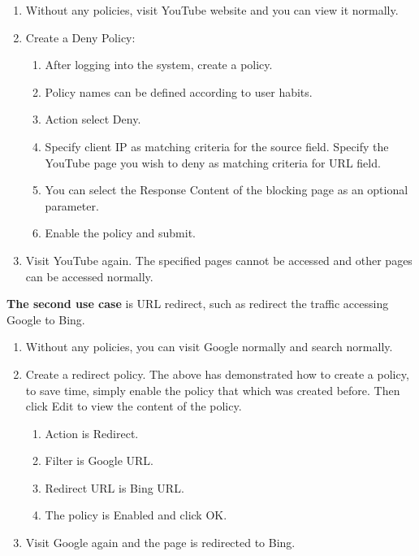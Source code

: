 \begin{description}[leftmargin=0pt,itemindent=0em]
    \item[] 
    \begin{enumerate}
        \item	Without any policies, visit YouTube website and you can view it normally.
        \item	Create a Deny Policy:
        \begin{enumerate}
            \item	After logging into the system, create a policy.
            \item	Policy names can be defined according to user habits.
            \item	Action select Deny.
            \item	Specify client IP as matching criteria for the source field. Specify the YouTube page you wish to deny as matching criteria for URL field.  
            \item	You can select the Response Content of the blocking page as an optional parameter.
            \item	Enable the policy and submit.
        \end{enumerate}	
        \item	Visit YouTube again. The specified pages cannot be accessed and other pages can be accessed normally.
    \end{enumerate}	
\end{description}

\textbf{The second use case} is URL redirect, such as redirect the traffic accessing Google to Bing.

\begin{description}[leftmargin=0pt,itemindent=0em]
    \item[] 
    \begin{enumerate}
        \item	Without any policies, you can visit Google normally and search normally.
        \item	Create a redirect policy. The above has demonstrated how to create a policy, to save time, simply enable the policy that which was created before. Then click Edit to view the content of the policy.
        \begin{enumerate}
            \item	Action is Redirect.
            \item	Filter is Google URL.
            \item	Redirect URL is Bing URL.
            \item	The policy is Enabled and click OK.
        \end{enumerate}
        \item	Visit Google again and the page is redirected to Bing.
    \end{enumerate}	
\end{description}

